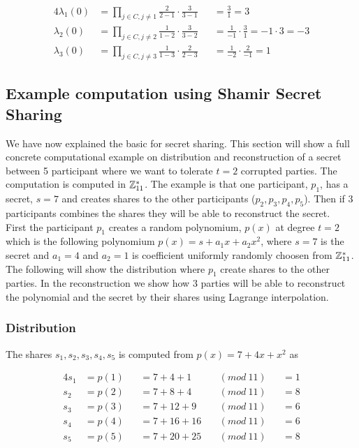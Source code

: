 \noindent
\begin{alignat*}{4}
\lambda_1(0) &=\prod\limits_{j\in C,j\neq 1} \frac{2}{2-1}  \cdot  \frac{3}{3-1} &&=\frac{3}{1} = 3 \\
\lambda_2(0) &=\prod\limits_{j\in C,j\neq 2} \frac{1}{1-2}  \cdot  \frac{3}{3-2} &&=\frac{1}{-1} \cdot  \frac{3}{1} =-1 \cdot  3=-3 \\
\lambda_3(0) &=\prod\limits_{j\in C,j\neq 3} \frac{1}{1-3}  \cdot  \frac{2}{2-3} &&=\frac{1}{-2} \cdot  \frac{2}{-1} =1  
\end{alignat*}




 \subsection{Example computation using Shamir Secret Sharing}
  \label{sec:example_computation_using_shamir_secret_sharing}
We have now explained the basic for secret sharing. This section will show a full concrete computational example on distribution and reconstruction of a secret between 5 participant where we want to tolerate $t=2$ corrupted parties. The computation is computed in $\mathbb{Z}_{11}^*$. The example is that one participant, $p_1$, has a secret, $s=7$ and creates shares to the other participants ($p_2, p_3, p_4, p_5$). Then if $3$ participants combines the shares they will be able to reconstruct the secret. \\

\noindent
First the participant $p_1$ creates a random polynomium, $p(x)$ at degree $t=2$ which is the following polynomium $p(x)=s + a_{1}x+ a_{2}x^2$, where $s=7$ is the secret and $a_{1}=4$ and $a_{2}=1$ is coefficient uniformly randomly choosen from $\mathbb{Z}_{11}^*$. The following will show the distribution where $p_1$ create shares to the other parties. In the reconstruction we show how $3$ parties will be able to reconstruct the polynomial and the secret by their shares using Lagrange interpolation.   

\subsubsection{Distribution}
The shares $s_1, s_2, s_3, s_4,s_5$ is computed from $p(x)=7 + 4x+ x^2$ as

\noindent
\begin{alignat*}{4}
s_1&=p(1)&&= 7+4+1 \ &&(mod \ 11) &&=1 \\
s_2&=p(2)&&= 7+8+4 \ &&(mod \ 11) &&=8 \\
s_3&=p(3)&&= 7+12+9 \ &&(mod \ 11) &&=6 \\
s_4&=p(4)&&= 7+16+16 \ &&(mod \ 11) &&=6 \\
s_5&=p(5)&&= 7+20+25 \ &&(mod \ 11) &&=8    
\end{alignat*}


